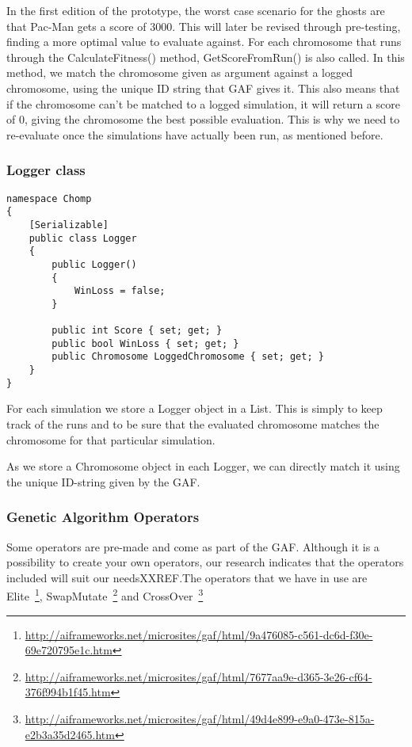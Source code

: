 In the first edition of the prototype, the worst case scenario for the ghosts are that Pac-Man gets a score of 3000. This will later be revised through pre-testing, finding a more optimal value to evaluate against.
For each chromosome that runs through the CalculateFitness() method, GetScoreFromRun() is also called. In this method, we match the chromosome given as argument against a logged chromosome, using the unique ID string that GAF gives it. This also means that if the chromosome can’t be matched to a logged simulation, it will return a score of 0, giving the chromosome the best possible evaluation. This is why we need to re-evaluate once the simulations have actually been run, as mentioned before.

\subsubsection*{Logger class}
\begin{lstlisting}[caption=Logger class and its constructor.,label=lst:logger]
namespace Chomp
{
	[Serializable]
	public class Logger
	{
		public Logger()
		{
			WinLoss = false;
		}

		public int Score { set; get; }
		public bool WinLoss { set; get; }
		public Chromosome LoggedChromosome { set; get; }
	}
}
\end{lstlisting}

For each simulation we store a Logger object in a List. This is simply to keep track of the runs and to be sure that the evaluated chromosome matches the chromosome for that particular simulation.

As we store a Chromosome object in each Logger, we can directly match it using the unique ID-string given by the GAF.

\subsubsection*{Genetic Algorithm Operators}
Some operators are pre-made and come as part of the GAF. Although it is a possibility to create your own operators, our research indicates that the operators included will suit our needsXXREF.The operators that we have in use are Elite~\footnote{\url{http://aiframeworks.net/microsites/gaf/html/9a476085-c561-dc6d-f30e-69e720795e1c.htm}}, SwapMutate~\footnote{\url{http://aiframeworks.net/microsites/gaf/html/7677aa9e-d365-3e26-cf64-376f994b1f45.htm}} and CrossOver~\footnote{\url{http://aiframeworks.net/microsites/gaf/html/49d4e899-e9a0-473e-815a-e2b3a35d2465.htm}}

